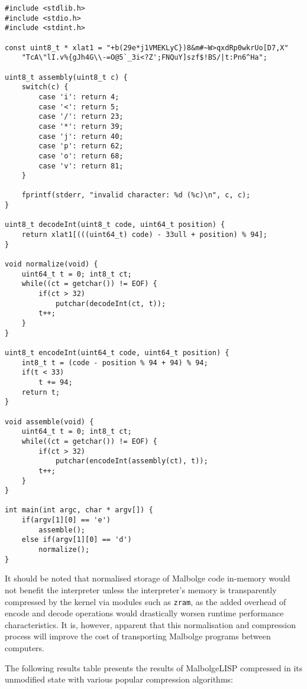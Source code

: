 \begin{verbatim}
#include <stdlib.h>
#include <stdio.h>
#include <stdint.h>

const uint8_t * xlat1 = "+b(29e*j1VMEKLyC})8&m#~W>qxdRp0wkrUo[D7,X"
    "TcA\"lI.v%{gJh4G\\-=O@5`_3i<?Z';FNQuY]szf$!BS/|t:Pn6^Ha";

uint8_t assembly(uint8_t c) {
    switch(c) {
        case 'i': return 4;
        case '<': return 5;
        case '/': return 23;
        case '*': return 39;
        case 'j': return 40;
        case 'p': return 62;
        case 'o': return 68;
        case 'v': return 81;
    }

    fprintf(stderr, "invalid character: %d (%c)\n", c, c);
}

uint8_t decodeInt(uint8_t code, uint64_t position) {
    return xlat1[(((uint64_t) code) - 33ull + position) % 94];
}

void normalize(void) {
    uint64_t t = 0; int8_t ct;
    while((ct = getchar()) != EOF) {
        if(ct > 32)
            putchar(decodeInt(ct, t));
        t++;
    }
}

uint8_t encodeInt(uint64_t code, uint64_t position) {
    int8_t t = (code - position % 94 + 94) % 94;
    if(t < 33)
        t += 94;
    return t;
}

void assemble(void) {
    uint64_t t = 0; int8_t ct;
    while((ct = getchar()) != EOF) {
        if(ct > 32)
            putchar(encodeInt(assembly(ct), t));
        t++;
    }
}

int main(int argc, char * argv[]) {
    if(argv[1][0] == 'e')
        assemble();
    else if(argv[1][0] == 'd')
        normalize();
}
\end{verbatim}

\par It should be noted that normalised storage of Malbolge code in-memory would not benefit the interpreter unless the interpreter's memory is transparently compressed by the kernel via modules such as \verb|zram|, as the added overhead of encode and decode operations would drastically worsen runtime performance characteristics. It is, however, apparent that this normalisation and compression process will improve the cost of transporting Malbolge programs between computers.

\par The following results table presents the results of MalbolgeLISP compressed in its unmodified state with various popular compression algorithms:

